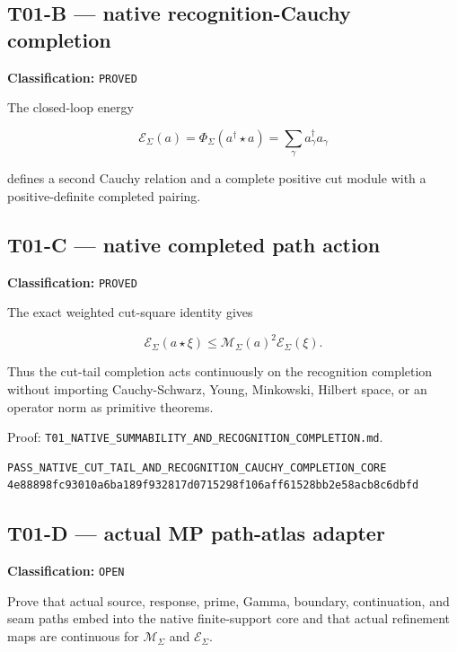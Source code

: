 \hypertarget{t01-b-native-recognition-cauchy-completion}{%
\subsection{T01-B --- native recognition-Cauchy completion}\label{t01-b-native-recognition-cauchy-completion}}

\textbf{Classification:} \texttt{PROVED}

The closed-loop energy

\[
\mathcal E_\Sigma(a)
=
\Phi_\Sigma(a^\dagger\star a)
=
\sum_\gamma a_\gamma^\dagger a_\gamma
\]

defines a second Cauchy relation and a complete positive cut module with a
positive-definite completed pairing.

\hypertarget{t01-c-native-completed-path-action}{%
\subsection{T01-C --- native completed path action}\label{t01-c-native-completed-path-action}}

\textbf{Classification:} \texttt{PROVED}

The exact weighted cut-square identity gives

\[
\boxed{
\mathcal E_\Sigma(a\star\xi)
\le
\mathcal M_\Sigma(a)^2\mathcal E_\Sigma(\xi).
}
\]

Thus the cut-tail completion acts continuously on the recognition completion
without importing Cauchy-Schwarz, Young, Minkowski, Hilbert space, or an operator
norm as primitive theorems.

Proof:
\texttt{T01\_NATIVE\_SUMMABILITY\_AND\_RECOGNITION\_COMPLETION.md}.

\begin{verbatim}
PASS_NATIVE_CUT_TAIL_AND_RECOGNITION_CAUCHY_COMPLETION_CORE
4e88898fc93010a6ba189f932817d0715298f106aff61528bb2e58acb8c6dbfd
\end{verbatim}

\hypertarget{t01-d-actual-mp-path-atlas-adapter}{%
\subsection{T01-D --- actual MP path-atlas adapter}\label{t01-d-actual-mp-path-atlas-adapter}}

\textbf{Classification:} \texttt{OPEN}

Prove that actual source, response, prime, Gamma, boundary, continuation, and
seam paths embed into the native finite-support core and that actual refinement
maps are continuous for \(\mathcal M_\Sigma\) and \(\mathcal E_\Sigma\).

